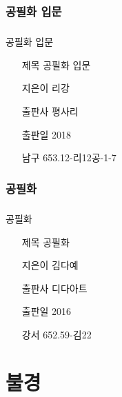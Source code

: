\documentclass[aspectratio=1610,17pt,xcolor=pdftex,dvipsnames,table,handout]{beamer}
\begin{document}
		\section{ 공필화 입문 }
		\begin{frame} [t,plain]
		\frametitle{}
			\begin{block} { 공필화 입문 }
			\setlength{\leftmargini}{4em}			
			\begin{itemize}
				\item [제목]  	공필화 입문 
				\item [지은이]	리강
				\item [출판사]	평사리 
				\item [출판일]	2018
				\item [남구]		653.12-리12공-1-7 
			\end{itemize}
			\end{block}						
		\end{frame}						


		\section{ 공필화  }
		\begin{frame} [t,plain]
		\frametitle{}
			\begin{block} { 공필화  }
			\setlength{\leftmargini}{4em}			
			\begin{itemize}
				\item [제목]  	공필화  
				\item [지은이]	김다예
				\item [출판사]	디다아트 
				\item [출판일]	2016
				\item [강서] 	652.59-김22	
			\end{itemize}
			\end{block}						
		\end{frame}						





		\part{ 불경 }
		\frame{\partpage}
\end{document}
